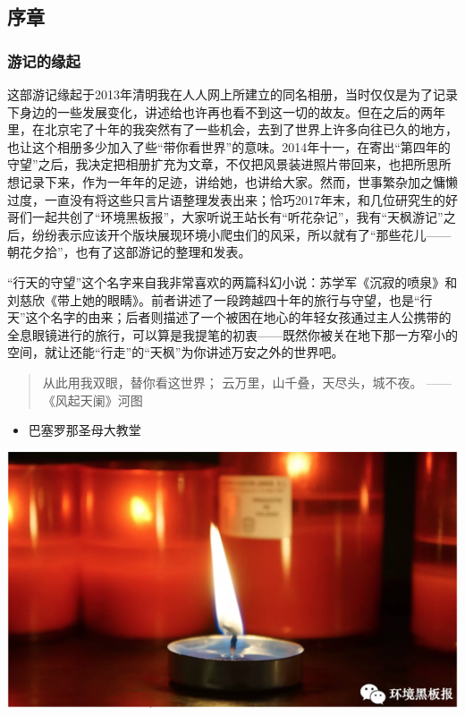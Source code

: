 \documentclass[]{book}
\providecommand{\tightlist}{%
  \setlength{\itemsep}{0pt}\setlength{\parskip}{0pt}}
\begin{document}
\subsection{序章}

\subsubsection{游记的缘起}

这部游记缘起于2013年清明我在人人网上所建立的同名相册，当时仅仅是为了记录下身边的一些发展变化，讲述给也许再也看不到这一切的故友。但在之后的两年里，在北京宅了十年的我突然有了一些机会，去到了世界上许多向往已久的地方，也让这个相册多少加入了些``带你看世界''的意味。2014年十一，在寄出``第四年的守望''之后，我决定把相册扩充为文章，不仅把风景装进照片带回来，也把所思所想记录下来，作为一年年的足迹，讲给她，也讲给大家。然而，世事繁杂加之慵懒过度，一直没有将这些只言片语整理发表出来；恰巧2017年末，和几位研究生的好哥们一起共创了``环境黑板报''，大家听说王站长有``听花杂记''，我有``天枫游记''之后，纷纷表示应该开个版块展现环境小爬虫们的风采，所以就有了``那些花儿------朝花夕拾''，也有了这部游记的整理和发表。

``行天的守望''这个名字来自我非常喜欢的两篇科幻小说：苏学军《沉寂的喷泉》和刘慈欣《带上她的眼睛》。前者讲述了一段跨越四十年的旅行与守望，也是``行天''这个名字的由来；后者则描述了一个被困在地心的年轻女孩通过主人公携带的全息眼镜进行的旅行，可以算是我提笔的初衷------既然你被关在地下那一方窄小的空间，就让还能``行走''的``天枫''为你讲述万安之外的世界吧。

\begin{quote}
从此用我双眼，替你看这世界； 云万里，山千叠，天尽头，城不夜。
------《风起天阑》河图
\end{quote}

\begin{itemize}
\tightlist
\item
  巴塞罗那圣母大教堂
\end{itemize}

\includegraphics[width=8.33in]{images/xt1}
\end{document}
